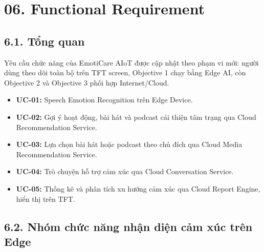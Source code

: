 \documentclass[12pt,a4paper]{article}
\begin{document}
\clearpage
\section*{06. Functional Requirement}

\subsection*{6.1. Tổng quan}

Yêu cầu chức năng của EmotiCare AIoT được cập nhật theo phạm vi mới: người dùng theo dõi toàn bộ trên TFT screen, Objective 1 chạy bằng Edge AI, còn Objective 2 và Objective 3 phối hợp Internet/Cloud.


\begin{itemize}
\item \textbf{UC-01:} Speech Emotion Recognition trên Edge Device.
\item \textbf{UC-02:} Gợi ý hoạt động, bài hát và podcast cải thiện tâm trạng qua Cloud Recommendation Service.
\item \textbf{UC-03:} Lựa chọn bài hát hoặc podcast theo chủ đích qua Cloud Media Recommendation Service.
\item \textbf{UC-04:} Trò chuyện hỗ trợ cảm xúc qua Cloud Conversation Service.
\item \textbf{UC-05:} Thống kê và phân tích xu hướng cảm xúc qua Cloud Report Engine, hiển thị trên TFT.
\end{itemize}

\subsection*{6.2. Nhóm chức năng nhận diện cảm xúc trên Edge}
\end{document}

